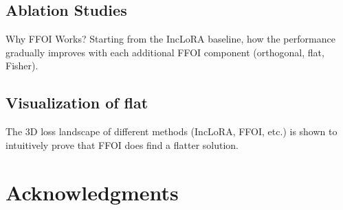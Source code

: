 \documentclass[letterpaper]{article} %
\newcommand{\LYY}[1]{{\color{magenta}{\bf LYY:} #1}}
\begin{document}
\subsection{Ablation Studies}
\LYY{Why FFOI Works? Starting from the IncLoRA baseline, how the performance gradually improves with each additional FFOI component (orthogonal, flat, Fisher).}

\subsection{Visualization of flat}
\LYY{The 3D loss landscape of different methods (IncLoRA, FFOI, etc.) is shown to intuitively prove that FFOI does find a flatter solution.}


\section{Acknowledgments}









\end{document}
